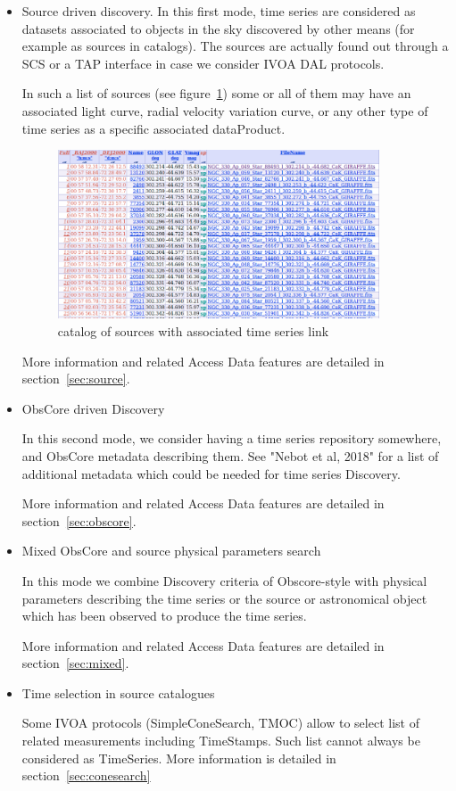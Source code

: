 \documentclass[11pt,a4paper]{ivoa}
\begin{document}
\begin{itemize}

  \item{Source driven discovery.}
     In this first mode, time series are considered as datasets associated to objects in the sky discovered by other means (for example as sources in catalogs). The sources are actually found out through a SCS or a TAP interface in case we consider  IVOA DAL protocols.

     In such a list of sources (see figure~\ref{fig:associated}) some or all of them may have an associated light curve, radial velocity variation curve, or any other type of time series as a specific associated dataProduct. 

\begin{figure}
\centering

\includegraphics[width=0.9\textwidth]{associated.png}
\caption{catalog of sources with associated time series link}
\label{fig:associated}
\end{figure}



      More information and related Access Data features are detailed in section~\ref{sec:source}.
   \item{ObsCore driven Discovery}

         In this second mode, we consider having a time series repository somewhere, and ObsCore metadata \citep{2017ivoa.spec.0509L} describing them. See "Nebot et al, 2018" for a  list of additional metadata which could be needed for time series Discovery.

          More information and related Access Data features are detailed in section~\ref{sec:obscore}.


    \item{Mixed ObsCore and source physical parameters search}

         In this mode we combine Discovery criteria of Obscore-style with physical parameters describing the time series or the source or astronomical object which has been observed to produce the time series.

More information and related Access Data features are detailed in section~\ref{sec:mixed}.
      \item{Time selection in source catalogues}
      
            Some IVOA protocols (SimpleConeSearch, TMOC) allow to select list of related measurements including TimeStamps. Such list cannot always be considered as TimeSeries. More information is detailed in section~\ref{sec:conesearch}
\end{itemize} 
\end{document}
